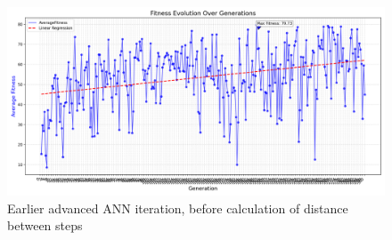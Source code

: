\documentclass[final,5p,times,twocolumn,authoryear]{elsarticle}
\begin{document}
\begin{figure}[H]
    \centering
    \includegraphics[width=1\linewidth]{figures/APPENDIX_ann_advance_best_first.png}
    \caption{Earlier advanced ANN iteration, before calculation of distance between steps}
    \label{fig:enter-label}
\end{figure}

\end{document}
